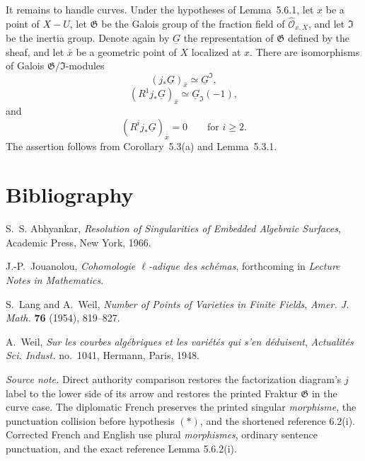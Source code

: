 It remains to handle curves.  Under the hypotheses of Lemma~5.6.1, let $x$
be a point of $X-U$, let $\mathfrak G$ be the Galois group of the fraction
field of $\widehat{\mathcal O}_{x,X}$, and let $\mathfrak I$ be the inertia
group.  Denote again by $\underline G$ the representation of $\mathfrak G$
defined by the sheaf, and let $\bar x$ be a geometric point of $X$ localized
at $x$.  There are isomorphisms of Galois
$\mathfrak G/\mathfrak I$-modules
\[
(j_*\underline G)_{\bar x}\simeq\underline G^{\mathfrak I},
\]
\[
(R^1j_*\underline G)_{\bar x}\simeq\underline G_{\mathfrak I}(-1),
\]
and
\[
(R^ij_*\underline G)_{\bar x}=0\qquad\text{for }i\geq2.
\]
The assertion follows from Corollary~5.3(a) and Lemma~5.3.1.

\section*{Bibliography}
\begin{enumerate}[label={\textup{[\arabic*]}},leftmargin=2.4em]
\item S.~S. Abhyankar, \emph{Resolution of Singularities of Embedded Algebraic Surfaces}, Academic Press, New York, 1966.
\item J.-P.~Jouanolou, \emph{Cohomologie $\ell$-adique des schémas}, forthcoming in \emph{Lecture Notes in Mathematics}.
\item S.~Lang and A.~Weil, \emph{Number of Points of Varieties in Finite Fields}, \emph{Amer. J. Math.} \textbf{76} (1954), 819--827.
\item A.~Weil, \emph{Sur les courbes algébriques et les variétés qui s'en déduisent}, \emph{Actualités Sci. Indust.} no.~1041, Hermann, Paris, 1948.
\end{enumerate}

\medskip
\noindent\emph{Source note.}
Direct authority comparison restores the factorization diagram's $j$ label
to the lower side of its arrow and restores the printed Fraktur
$\mathfrak G$ in the curve case.  The diplomatic French preserves the
printed singular \emph{morphisme}, the punctuation collision before
hypothesis $(*)$, and the shortened reference 6.2(i).  Corrected French and
English use plural \emph{morphismes}, ordinary sentence punctuation, and the
exact reference Lemma 5.6.2(i).
